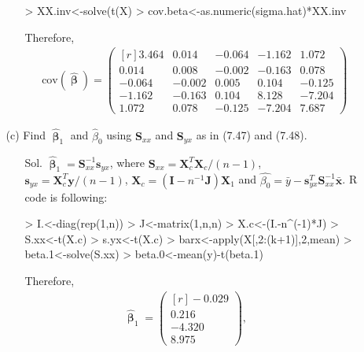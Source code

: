\documentclass[12pt]{article} %
\begin{document}
\begin{enumerate}
\begin{enumerate}
\begin{itemize}
\begin{Schunk}
\begin{Sinput}
> XX.inv<-solve(t(X)%
> cov.beta<-as.numeric(sigma.hat)*XX.inv
\end{Sinput}
\end{Schunk}
		  Therefore, 
		  \begin{eqnarray*}
		    \mathrm{cov}(\pmb{\hat{\upbeta}})=
		    \begin{pmatrix}[r]
			  3.464 & 0.014 &-0.064 &-1.162 & 1.072\\
			  0.014 & 0.008 &-0.002 &-0.163 & 0.078\\
			 -0.064 &-0.002 & 0.005 & 0.104 &-0.125\\
			 -1.162 &-0.163 & 0.104 & 8.128 &-7.204\\
			  1.072 & 0.078 &-0.125 &-7.204 & 7.687		    
		    \end{pmatrix}
		  \end{eqnarray*}   	  
	   	\end{itemize}
	   \item[(c)] Find $\pmb{\hat{\upbeta}}_{1}$ and $\hat{\beta}_{0}$ using 
           $\mathbf{S}_{xx}$ and $\mathbf{S}_{yx}$ as in (7.47) and (7.48).
        \begin{itemize}
         \item[Sol.] $\hat{\pmb{\upbeta}}_{1}=\mathbf{S}_{xx}^{-1}\mathbf{s}_{yx}$, where 
         $\mathbf{S}_{xx}=\mathbf{X}_{c}^{T}\mathbf{X}_{c}/(n-1)$,  
         $\mathbf{s}_{yx}=\mathbf{X}_{c}^{T}\mathbf{y}/(n-1)$,  
         $\mathbf{X}_{c}=(\mathbf{I}-n^{-1}\mathbf{J})\mathbf{X}_{1}$ and  
         $\hat{\beta_{0}}=\bar{y}-\mathbf{s}_{yx}^{T}\mathbf{S}_{xx}^{-1}\bar{\mathbf{x}}$.
         R code is following:
\begin{Schunk}
\begin{Sinput}
> I.<-diag(rep(1,n))
> J<-matrix(1,n,n)
> X.c<-(I.-n^(-1)*J)%
> S.xx<-t(X.c)%
> s.yx<-t(X.c)%
> barx<-apply(X[,2:(k+1)],2,mean)
> beta.1<-solve(S.xx)%
> beta.0<-mean(y)-t(beta.1)%
\end{Sinput}
\end{Schunk}
		 Therefore, 
		 \begin{eqnarray*}
		  \pmb{\hat{\upbeta}}_{1}=
		  \begin{pmatrix}[r]
		   -0.029 \\
 			0.216 \\
		   -4.320 \\
 			8.975		   
		  \end{pmatrix},&&

\end{eqnarray*}
\end{itemize}
\end{enumerate}
\end{enumerate}
\end{document}
